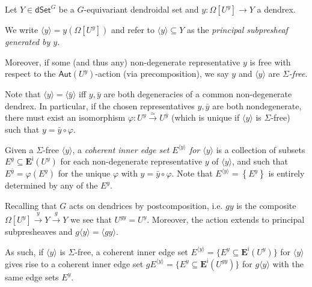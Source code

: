 \documentclass[a4paper,10pt
,draft
]{article}%
\renewcommand{\1}{\eta}%
\begin{document}
\begin{notation}
Let $Y \in \mathsf{dSet}^G$ be a $G$-equivariant dendroidal set and 
$y \colon \Omega[U^y] \to Y$
a dendrex.

We write $\langle y \rangle = y\left(  \Omega[U^y] \right)$
and refer to
$\langle y \rangle \subseteq Y$
as the \emph{principal subpresheaf generated by $y$}.

Moreover, if some (and thus any)
non-degenerate representative $y$ is free
with respect to the $\mathsf{Aut}(U^y)$-action (via precomposition),
we say $y$ and $\langle y \rangle$ are \emph{$\Sigma$-free}.
\end{notation}



\begin{remark}
Note that
$\langle y \rangle = \langle \bar{y} \rangle$
iff $y,\bar{y}$ are both degeneracies of a common non-degenerate dendrex.
In particular, if the chosen representatives $y,\bar{y}$ are both nondegenerate,
there must exist an isomorphism
$\varphi \colon U^y \xrightarrow{\simeq} U^{\bar{y}}$
(which is unique if 
$\langle y \rangle$ is $\Sigma$-free)
such that $y= \bar{y} \circ \varphi$.

\end{remark}


\begin{notation}
Given a $\Sigma$-free $\langle y \rangle$,
a \emph{coherent inner edge set $E^{\langle y \rangle}$ for $\langle y \rangle$}
is a collection of subsets 
$E^y \subseteq \boldsymbol{E}^{\mathsf{i}}(U^y)$
for each non-degenerate representative $y$ of $\langle y \rangle$, and such that 
$E^{\bar{y}}  = \varphi \left(E^y \right)$
for the unique $\varphi$ with $y= \bar{y} \circ \varphi$.
Note that $E^{\langle y \rangle} = \left\{E^y \right\}$
is entirely determined by any of the $E^y$.
%
\end{notation}


\begin{remark}
Recalling that $G$ acts on dendrices by postcomposition, i.e.
$gy$ is the composite
$\Omega[U^y] \xrightarrow{y} Y \xrightarrow{g} Y$
we see that $U^{gy} = U^{y}$.
Moreover, the action extends to principal subpresheaves and
$g \langle y \rangle = \langle g y \rangle$.

As such, if $\langle y\rangle$ is $\Sigma$-free, a coherent inner edge set 
$E^{\langle y \rangle} = \{E^y \subseteq \boldsymbol{E}^{\mathsf{i}}(U^y)\}$
for $\langle y \rangle$
gives rise to a coherent inner edge set 
$g E^{\langle y \rangle} = \{E^y \subseteq \boldsymbol{E}^{\mathsf{i}}(U^{gy})\}$
for $g\langle y \rangle$
with the same edge sets $E^y$.
\end{remark}
\end{document}
